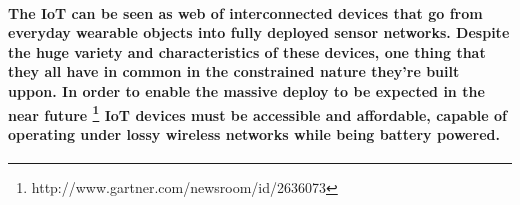 \paragraph{
The \ac{IoT} can be seen as web of interconnected devices that go from everyday wearable objects into fully deployed sensor networks. Despite the huge variety and characteristics of these devices, one thing that they all have in common in the constrained nature they're built uppon. In order to enable the massive deploy to be expected in the near future \footnote{http://www.gartner.com/newsroom/id/2636073} \ac{IoT} devices must be accessible and affordable, capable of operating under lossy wireless networks while being battery powered.
}
